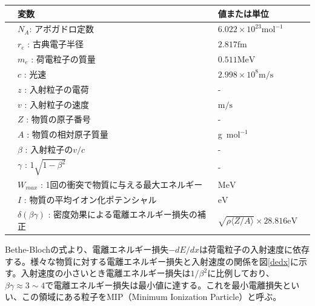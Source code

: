 \begin{table}[H]
 \label{table:bethe}
 \centering
  \begin{tabular}{clll}
   \hline \hline
   &変数 & 値または単位 \\
   \hline
&$N_A $: アボガドロ定数 & $6.022 \times 10^23 {\si{\mol}}^{-1}$\\
&$r_e$ : 古典電子半径&$2.817 \mathrm{fm}$\\ 
&$m_e$ : 荷電粒子の質量 &$0.511\mathrm{MeV}$\\
&$c$ : 光速 & $2.998 \times 10^8 \mathrm{m/s}$\\
&$z$ : 入射粒子の電荷& - \\
&$v$ : 入射粒子の速度& $\mathrm{m/s}$\\
&$Z$ : 物質の原子番号 & - \\
&$A$ : 物質の相対原子質量 & g\ ${\si{\mol}}^{-1}$ \\
&$\beta$ : 入射粒子の$v/c$ & - \\
&$\gamma$ : $1\sqrt{1-{\beta}^2}$ & - \\
&$W_{max}$ : 1回の衝突で物質に与える最大エネルギー & $\mathrm{MeV}$\\
&$I$ : 物質の平均イオン化ポテンシャル &$\mathrm{eV}$\\
&$\delta(\beta \gamma)$ : 密度効果による電離エネルギー損失の補正 & $\sqrt{\rho \langle Z/A\rangle } \times 28.816\mathrm{eV}$\\
  \end{tabular}
\end{table}
Bethe-Blochの式より、電離エネルギー損失$-dE/dx$は荷電粒子の入射速度に依存する。様々な物質に対する電離エネルギー損失と入射速度の関係を図\ref{dedx}に示す。入射速度の小さいとき電離エネルギー損失は$1/{\beta}^2$に比例しており、$\beta \gamma  \approx 3 \sim 4$で電離エネルギー損失は最小値に達する。これを最小電離損失といい、この領域にある粒子をMIP（Minimum Ionization Particle）と呼ぶ。\\
\clearpage

